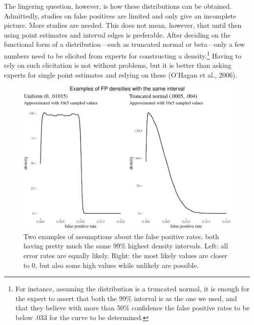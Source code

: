 \documentclass[
  10pt,
  dvipsnames,enabledeprecatedfontcommands]{scrartcl}
\begin{document}
The lingering question, however, is how these distributions can be
obtained. Admittedly, studies on false positives are limited and only
give an incomplete picture. More studies are needed. This does not mean,
however, that until then using point estimates and interval edges is
preferable. After deciding on the functional form of a
distribution---such as truncated normal or beta---only a few numbers
need to be elicited from experts for constructing a density.\footnote{For
  instance, assuming the distribution is a truncated normal, it is
  enough for the expert to assert that both the 99\% interval is as the
  one we used, and that they believe with more than 50\% confidence the
  false positive rates to be below \(.033\) for the curve to be
  determined.} Having to rely on such elicitation is not without
problems, but it is better than asking experts for single point
estimates and relying on these (O'Hagan et al., 2006).

\begin{figure}[H]



\begin{center}\includegraphics[width=0.8\linewidth]{imprecision_philosophical_paper._files/figure-latex/fig:fppdistros-1} \end{center}


\caption{Two examples of assumptions about the false positive rates, both having pretty much the same 99\% highest density intervals. Left: all error rates are equally likely. Right: the most likely values are closer to 0, but also some high values while unlikely are possible.}

\label{fig:fppdistros}

\end{figure}
\end{document}
